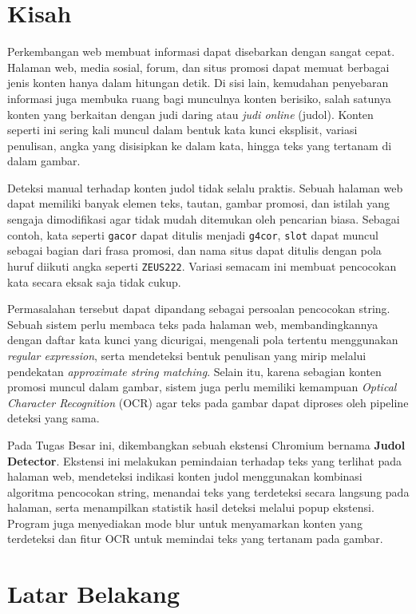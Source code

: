 \section{Kisah}

Perkembangan web membuat informasi dapat disebarkan dengan sangat cepat.
Halaman web, media sosial, forum, dan situs promosi dapat memuat berbagai
jenis konten hanya dalam hitungan detik. Di sisi lain, kemudahan penyebaran
informasi juga membuka ruang bagi munculnya konten berisiko, salah satunya
konten yang berkaitan dengan judi daring atau \textit{judi online} (judol).
Konten seperti ini sering kali muncul dalam bentuk kata kunci eksplisit,
variasi penulisan, angka yang disisipkan ke dalam kata, hingga teks yang
tertanam di dalam gambar.

Deteksi manual terhadap konten judol tidak selalu praktis. Sebuah halaman web
dapat memiliki banyak elemen teks, tautan, gambar promosi, dan istilah yang
sengaja dimodifikasi agar tidak mudah ditemukan oleh pencarian biasa. Sebagai
contoh, kata seperti \texttt{gacor} dapat ditulis menjadi \texttt{g4cor},
\texttt{slot} dapat muncul sebagai bagian dari frasa promosi, dan nama situs
dapat ditulis dengan pola huruf diikuti angka seperti \texttt{ZEUS222}.
Variasi semacam ini membuat pencocokan kata secara eksak saja tidak cukup.

Permasalahan tersebut dapat dipandang sebagai persoalan pencocokan string.
Sebuah sistem perlu membaca teks pada halaman web, membandingkannya dengan
daftar kata kunci yang dicurigai, mengenali pola tertentu menggunakan
\textit{regular expression}, serta mendeteksi bentuk penulisan yang mirip
melalui pendekatan \textit{approximate string matching}. Selain itu, karena
sebagian konten promosi muncul dalam gambar, sistem juga perlu memiliki
kemampuan \textit{Optical Character Recognition} (OCR) agar teks pada gambar
dapat diproses oleh pipeline deteksi yang sama.

Pada Tugas Besar ini, dikembangkan sebuah ekstensi Chromium bernama
\textbf{Judol Detector}. Ekstensi ini melakukan pemindaian terhadap teks yang
terlihat pada halaman web, mendeteksi indikasi konten judol menggunakan
kombinasi algoritma pencocokan string, menandai teks yang terdeteksi secara
langsung pada halaman, serta menampilkan statistik hasil deteksi melalui popup
ekstensi. Program juga menyediakan mode blur untuk menyamarkan konten yang
terdeteksi dan fitur OCR untuk memindai teks yang tertanam pada gambar.

\section{Latar Belakang}

